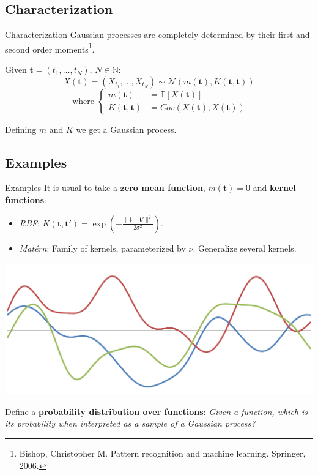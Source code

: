 \documentclass[10pt]{beamer}
\begin{document}
\subsection{Characterization}
\begin{frame}{Characterization}
    Gaussian processes are completely determined by their first and second order moments\footnote{Bishop, Christopher M. Pattern recognition and machine learning. Springer, 2006.}.

    Given \( \bm{t} = (t_1, \dots, t_N) \), \( N \in \mathbb{N} \):
    \[
         X(\bm{t}) = (X_{t_1}, \dots, X_{t_N}) \sim \mathcal{N}\left( m(\bm{t}), K(\bm{t}, \bm{t}) \right)
    \] 
    \[
         \text{ where } 
         \begin{cases}
             m(\bm{t}) &= \mathbb{E}\left[X(\bm{t})\right]\\
             K(\bm t, \bm t) &= Cov\left(X(\bm{t}), X(\bm{t})\right)
         \end{cases}
    \] 
    
    Defining \( m \) and \( K \) we get a Gaussian process.
\end{frame}

\subsection{Examples}
\begin{frame}{Examples}
    It is usual to take a \textbf{zero mean function}, \( m(\bm{t}) = 0 \) and \textbf{kernel functions}:
    \begin{itemize}
        \item \textit{RBF}: \( K (\bm{t}, \bm{t}') = \exp \left( - \frac{\|\bm t - \bm t' \|^{2}}{2\sigma^{2}} \right) \). 
        \item \textit{Matérn}: Family of kernels, parameterized by \( \nu \). Generalize several kernels. 
    \end{itemize} 

    \centering
    \includegraphics[scale = 0.2]{imgs/GP.png}

    Define a \textbf{probability distribution over functions}: \emph{Given a function, which is its probability when interpreted as a sample of a Gaussian process?}
\end{frame}
\end{document}
